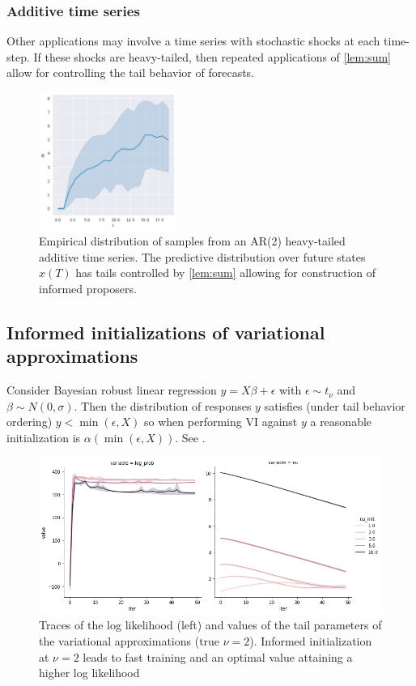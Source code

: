 \documentclass{article}
\theoremstyle{definition}
\begin{document}
{\subsubsection{Additive time series}

Other applications may involve a time series with stochastic shocks at each time-step.
If these shocks are heavy-tailed, then repeated applications of \cref{lem:sum} allow
for controlling the tail behavior of forecasts.


\begin{figure}[H]
    \centering
    \includegraphics[width=0.4\textwidth]{figures/ar2.png}
    \caption{Empirical distribution of samples from an AR(2) heavy-tailed additive time series.
    The predictive distribution over future states $x(T)$ has tails controlled by \cref{lem:sum}
    allowing for construction of informed proposers.
    }
\end{figure}

\subsection{Informed initializations of variational approximations}

Consider Bayesian robust linear regression $y = X \beta + \epsilon$
with $\epsilon \sim t_\nu$ and $\beta \sim N(0,\sigma)$. Then the distribution
of responses $y$ satisfies (under tail behavior ordering) $y < \min(\epsilon, X)$ so
when performing VI against $y$ a reasonable initialization is $\alpha(\min(\epsilon, X))$.
See .

\begin{figure}[h]
    \centering
    \includegraphics[width=.8\textwidth]{figures/vi-lin.png}
    \caption{Traces of the log likelihood (left) and values of the tail parameters of
    the variational approximations (true $\nu=2$). Informed initialization at $\nu=2$ leads
    to fast training and an optimal value attaining a higher log likelihood}
    \label{fig:vi-lin}
\end{figure}



}
\end{document}
